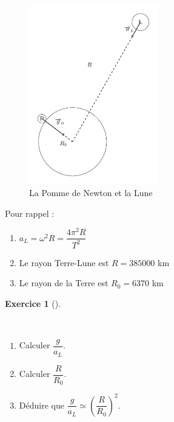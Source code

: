 \documentclass[
  letterpaper,
  DIV=11,
  numbers=noendperiod]{scrartcl}
\providecommand{\tightlist}{%
  \setlength{\itemsep}{0pt}\setlength{\parskip}{0pt}}\usepackage{longtable,booktabs,array}
\theoremstyle{definition}
\newtheorem{exercise}{Exercice}[section]
\theoremstyle{definition}
\theoremstyle{definition}
\theoremstyle{remark}
\begin{document}
\begin{figure}[H]

{\centering \includegraphics[width=0.5\textwidth,height=\textheight]{figures/grav/fig3.pdf}

}

\caption{La Pomme de Newton et la Lune}

\end{figure}%

Pour rappel :

\begin{enumerate}
\def\labelenumi{\arabic{enumi}.}
\tightlist
\item
  \(a_L = \omega^2 R = \dfrac{4\pi^2 R}{T^2}\)
\item
  Le rayon Terre-Lune est \(R = 385 000\) km
\item
  Le rayon de la Terre est \(R_0 = 6370\) km
\end{enumerate}

\begin{exercise}[]\protect\hypertarget{exr-lune}{}\label{exr-lune}

~

\begin{enumerate}
\def\labelenumi{\arabic{enumi}.}
\tightlist
\item
  Calculer \(\dfrac{g}{a_L}\).
\item
  Calculer \(\dfrac{R}{R_0}\).
\item
  Déduire que \(\dfrac{g}{a_L} \simeq \left(\dfrac{R}{R_0}\right)^2\).
\end{enumerate}

\end{exercise}
\end{document}
